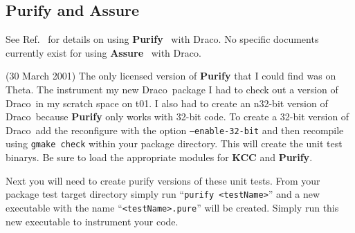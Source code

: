 \documentclass[10pt]{nmemo}
\newcommand{\comp}[1]{\normalfont\normalsize\texttt{#1}}
\newcommand{\draco}{{\normalfont\sffamily Draco}}
\begin{document}







\subsection{Purify and Assure}

See Ref.~\cite{draco-purify} for details on using
\textbf{Purify}~\cite{purify} with \draco.  No specific documents
currently exist for using \textbf{Assure}~\cite{assure} with \draco.

(30 March 2001) The only licensed version of \textbf{Purify} that I
could find was on Theta.  The instrument my new \draco\ package I had
to check out a version of \draco\ in my scratch space on t01.  I also
had to create an n32-bit version of \draco\ because \textbf{Purify}
only works with 32-bit code.  To create a 32-bit version of \draco\
add the reconfigure with the option \comp{--enable-32-bit} and then
recompile using \comp{gmake check} within your package directory.
This will create the unit test binarys.  Be sure to load the
appropriate modules for \textbf{KCC} and \textbf{Purify}.

Next you will need to create purify versions of these unit tests.
From your package test target directory simply run ``\comp{purify
 <testName>}'' and a new executable with the name
``\comp{<testName>.pure}'' will be created.  Simply run this new
executable to instrument your code.
\end{document}

